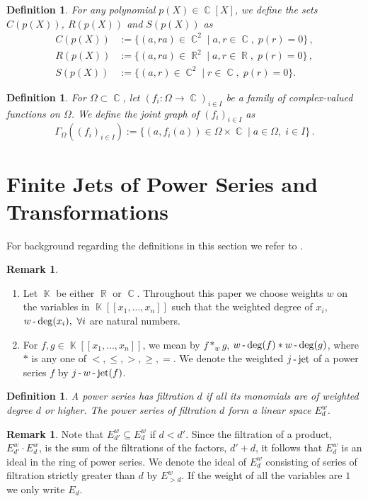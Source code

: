 \documentclass[noend]{amsproc}
\newtheorem{defn}[theorem]{Definition}
\theoremstyle{definition}
\newtheorem{remark}[theorem]{Remark}
\DeclareMathOperator{\R}{\mathbb{R}}
\DeclareMathOperator{\C}{\mathbb{C}}
\DeclareMathOperator{\K}{\mathbb{K}}
\DeclareMathOperator{\dash}{\textnormal{-}}
\DeclareMathOperator{\jet}{jet}
\begin{document}
\begin{defn}
For any polynomial $p(X) \in \C[X]$, we define the sets $C(p(X))$, $R(p(X))$ and $S(p(X))$
as
\begin{align*}
C(p(X)) &:= \{ (a, ra) \in \C^2 \mid a, r \in \C, \; p(r) = 0 \} \,, \\
R(p(X)) &:= \{ (a, ra) \in \R^2 \mid a, r \in \R, \; p(r) = 0 \} \,,\\
S(p(X)) &:= \{(a,r)\in\C^2\mid r\in\C,\; p(r)=0\}.
\end{align*}
\end{defn}

\begin{defn}
For $\Omega \subset \C$, let $(f_i: \Omega \rightarrow \C)_{i \in I}$ be a
family of complex-valued functions on $\Omega$. We define the joint graph of
$(f_i)_{i \in I}$ as
\[
\Gamma_\Omega((f_i)_{i \in I})
:= \{ (a, f_i(a)) \in \Omega \times \C \mid a\in \Omega,\; i \in I \}\,.
\]
\end{defn}

\section{Finite Jets of Power Series and Transformations}

For background regarding the definitions in this section we refer to \cite{A1975}.

\begin{remark}
\phantom{X}\hfill
\begin{enumerate}
\item Let $\K$ be either $\R$ or $\C$. Throughout this paper we choose weights $w$ on the variables in $\K[[x_1,\ldots,x_n]]$ such that the weighted degree of $x_i$, $w\dash\deg(x_i),\ \forall i$ are natural numbers. 
\item For $f,g\in\K[[x_1,\ldots,x_n]]$, we mean by $f*_wg$, $w\dash\deg(f)* w\dash\deg(g)$, where $*$ is any one of $<,\le,>,\ge,=$. We denote the weighted $j\dash\jet$ of a power series $f$ by $j\dash w\dash\jet(f)$.
\end{enumerate}
\end{remark}

\begin{defn}
A power series has filtration $d$ if all its monomials are of weighted degree $d$ or higher. The power series of filtration $d$ form a linear space $E_d^w$.
\end{defn}

\begin{remark}
Note that $E_{d'}^w\subseteq E_d^w$ if $d<d'$. Since the filtration of a product, $E_{d'}^w\cdot E_d^w$, is the sum of the filtrations of the factors, $d'+d$, it follows that $E_d^w$ is an ideal in the ring of power series. We denote the ideal of $E_d^w$ consisting of series of filtration strictly greater than $d$ by $E_{>d}^w$. If the weight of all the variables are $1$ we only write $E_d$. 
\end{remark}
\end{document}

